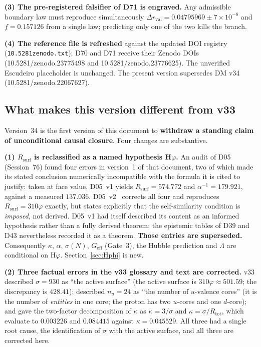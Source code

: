\documentclass[11pt,a4paper]{article}
\theoremstyle{plain}
\theoremstyle{definition}
\theoremstyle{remark}
\newcommand{\Geff}{G_{\mathrm{eff}}}
\newcommand{\Rsurf}{R_{\mathrm{surf}}}
\newcommand{\Rtot}{R_{\mathrm{tot}}}
\newcommand{\sigmaN}{\sigma(N)}
\begin{document}
\textbf{(3) The pre-registered falsifier of D71 is engraved.} Any admissible boundary law must reproduce simultaneously $\Delta r_{\mathrm{val}}=0.04795969\pm7\times10^{-8}$ and $f=0.157126$ from a single law; predicting only one of the two kills the branch.

\textbf{(4) The reference file is refreshed} against the updated DOI registry (\texttt{10.5281zenodo.txt}); D70 and D71 receive their Zenodo DOIs (10.5281/zenodo.23775498 and 10.5281/zenodo.23776625). The unverified Escudeiro placeholder is unchanged. The present version supersedes DM v34 (10.5281/zenodo.22067627).

\subsection{What makes this version different from v33}
\label{subsec:diffv33}
Version~34 is the first version of this document to \textbf{withdraw a standing claim of unconditional causal closure}. Four changes are substantive.

\textbf{(1) $\Rsurf$ is reclassified as a named hypothesis H$\varphi$.} An audit of D05 (Session~76) found four errors in version~1 of that document, two of which made its stated conclusion numerically incompatible with the formula it is cited to justify: taken at face value, D05~v1 yields $\Rsurf=574.772$ and $\alpha^{-1}=179.921$, against a measured $137.036$. D05~v2~\cite{D05} corrects all four and reproduces $\Rsurf=310\varphi$ exactly, but states explicitly that the self-similarity condition is \emph{imposed}, not derived. D05~v1 had itself described its content as an informed hypothesis rather than a fully derived theorem; the epistemic tables of D39 and D43 nevertheless recorded it as a theorem. \textbf{Those entries are superseded.} Consequently $\kappa$, $\alpha$, $\sigmaN$, $\Geff$ (Gate~3), the Hubble prediction and $\Lambda$ are conditional on H$\varphi$. Section~\ref{sec:Hphi} is new.

\textbf{(2) Three factual errors in the v33 glossary and text are corrected.} v33 described $\sigma=930$ as ``the active surface'' (the active surface is $310\varphi\approx501.59$; the discrepancy is $428.41$); described $n_u=24$ as ``the number of $u$-valence cores'' (it is the number of \emph{entities} in one core; the proton has two $u$-cores and one $d$-core); and gave the two-factor decomposition of $\kappa$ as $\kappa=3/\sigma$ and $\kappa=\sigma/\Rtot$, which evaluate to $0.003226$ and $0.084415$ against $\kappa=0.045529$. All three had a single root cause, the identification of $\sigma$ with the active surface, and all three are corrected here.
\end{document}
